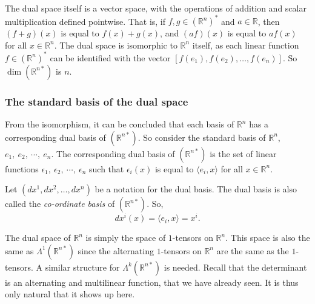 \documentclass{article}
\theoremstyle{definition}
\theoremstyle{named}
\begin{document}
The dual space itself is a vector space, with the operations of addition and scalar multiplication defined pointwise. That is, if $f, g \in (\mathbb{R}^n)^*$ and $a \in \mathbb{R}$, then $(f + g)(x) $ is equal to $ f(x) + g(x)$, and $(af)(x)$ is equal to $a f(x)$ for all $x \in \mathbb{R}^n$. The dual space is isomorphic to $\mathbb{R}^n$ itself, as each linear function  $f \in (\mathbb{R}^n)^*$ can be identified with the vector $[f(e_1), f(e_2), \ldots, f(e_n)]$. So $\dim (\mathbb{R}^{n*})$ is $n$.

\subsubsection{The standard basis of the dual space}
From the isomorphism, it can be concluded that each basis of $\mathbb{R}^n$ has a corresponding dual basis of $(\mathbb{R}^{n*})$. So consider the standard basis of $\mathbb{R}^n$, $e_1,\  e_2, \ \cdots, \ e_n$. The corresponding dual basis of $(\mathbb{R}^{n*})$ is the set of linear functions $\epsilon_1, \ \epsilon_2, \ \cdots, \ \epsilon_n$ such that $\epsilon_i(x) $ is equal to $ \langle e_i, x \rangle$ for all $x \in \mathbb{R}^n$. 

 Let $(dx^1, dx^2, \ldots, dx^n)$ be a notation for the dual basis. The dual basis is also called the \textit{co-ordinate basis} of $(\mathbb{R}^{n*})$. So,
$$dx^i(x) = \langle e_i, x \rangle = x^i .$$ 

The dual space of $\mathbb{R}^n$ is simply the space of $1$-tensors on $\mathbb{R}^n$. This space is also the same as $\Lambda^1(\mathbb{R}^{n*})$ since the alternating $1$-tensors on $\mathbb{R}^n$ are the same as the $1$-tensors.
A similar structure for $\Lambda^k(\mathbb{R}^{n*})$ is needed. Recall that the determinant is an alternating and multilinear function, that we have already seen. It is thus only natural that it shows up here. 
\end{document}
